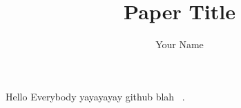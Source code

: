 \documentclass{article}
\title{Paper Title}
\author{Your Name}
\begin{document}
    \maketitle

     

     

Hello Everybody yayayayay github
    blah ~\cite{Jo09, PaperII}.

     

     
    
    

     

    
\end{document}
